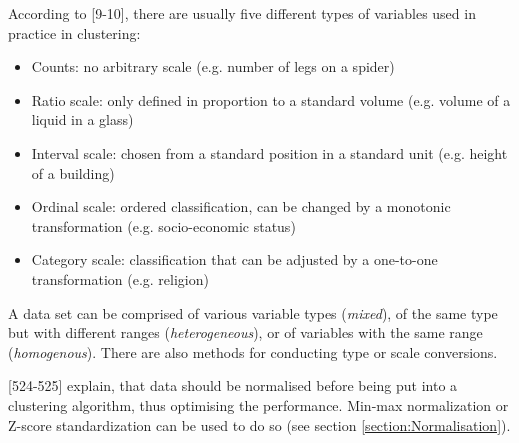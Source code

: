 According to \textcite{hartigan1975clustering}[9-10], there are usually five different types of variables used in practice in clustering:
\begin{itemize}
  \item Counts: no arbitrary scale (e.g. number of legs on a spider) 
  \item Ratio scale: only defined in proportion to a standard volume (e.g. volume of a liquid in a glass)
  \item Interval scale: chosen from a standard position in a standard unit (e.g. height of a building)
  \item Ordinal scale: ordered classification, can be changed by a monotonic transformation (e.g. socio-economic status)
  \item Category scale: classification that can be adjusted by a one-to-one transformation (e.g. religion)
\end{itemize}
A data set can be comprised of various variable types (\textit{mixed}), of the same type but with different ranges (\textit{heterogeneous}), or of variables with the same range (\textit{homogenous}). There are also methods for conducting type or scale conversions.



\textcite{DataMiningAndPredictiveAnalytics}[524-525] explain, that data should be normalised before being put into a clustering algorithm, thus optimising the performance. Min-max normalization or Z-score standardization can be used to do so (see section \ref{section:Normalisation}).












